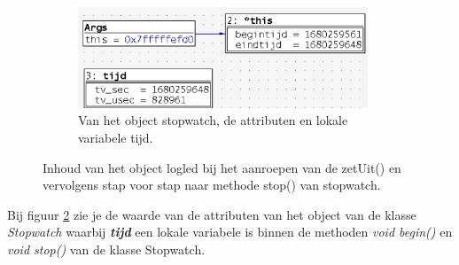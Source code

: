 \begin{enumerate}[label=\alph*]
\begin{figure}[h!]
\begin{center}
\begin{subfigure}[b]{0.49\textwidth}
			\label{fig:logObjectA}
		\end{subfigure}
		\begin{subfigure}[b]{0.49\textwidth}
			\includegraphics[width=0.95\textwidth]{figuren/ddd_logled_p2b}
			\caption{Van het object stopwatch, de attributen en lokale variabele tijd.}
			\label{fig:logObjectB}
		\end{subfigure}
		\caption{Inhoud van het object logled bij het aanroepen van de  zetUit() en vervolgens stap voor stap naar methode stop() van stopwatch.}
		\label{fig:logledOjecten}   
	\end{center}
\end{figure}
Bij figuur \ref{fig:logObjectB} zie je de waarde van de attributen van het object van de klasse \textit{Stopwatch} waarbij \textit{\textbf{tijd}} een lokale variabele is binnen de methoden \textit{void begin()} en \textit{void stop()} van de klasse Stopwatch.
\end{enumerate}



